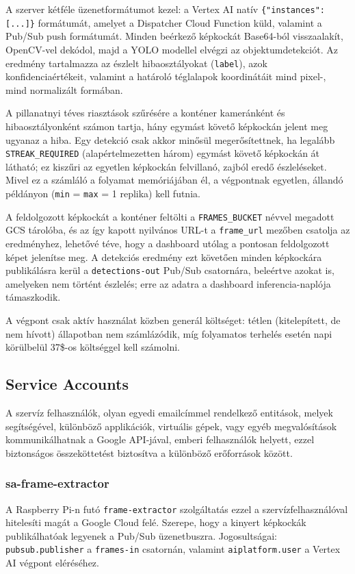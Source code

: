         A szerver kétféle üzenetformátumot kezel: a Vertex AI natív \texttt{\{"instances": [...]\}} formátumát,
        amelyet a Dispatcher Cloud Function küld, valamint a Pub/Sub push formátumát.
        Minden beérkező képkockát Base64-ból visszaalakít, OpenCV-vel dekódol, majd a YOLO modellel elvégzi az objektumdetekciót.
        Az eredmény tartalmazza az észlelt hibaosztályokat (\texttt{label}), azok konfidenciaértékeit, valamint a határoló téglalapok
        koordinátáit mind pixel-, mind normalizált formában.

        A pillanatnyi téves riasztások szűrésére a konténer kameránként és hibaosztályonként számon tartja, hány egymást követő képkockán
        jelent meg ugyanaz a hiba. Egy detekció csak akkor minősül megerősítettnek, ha legalább \texttt{STREAK\_REQUIRED}
        (alapértelmezetten három) egymást követő képkockán át látható; ez kiszűri az egyetlen képkockán felvillanó, zajból eredő észleléseket.
        Mivel ez a számláló a folyamat memóriájában él, a végpontnak egyetlen, állandó példányon (\texttt{min} = \texttt{max} = 1 replika) kell futnia.

        A feldolgozott képkockát a konténer feltölti a \texttt{FRAMES\_BUCKET} névvel megadott GCS tárolóba, és az így kapott nyilvános URL-t a
        \texttt{frame\_url} mezőben csatolja az eredményhez, lehetővé téve, hogy a dashboard utólag a pontosan feldolgozott képet jelenítse meg.
        A detekciós eredmény ezt követően minden képkockára publikálásra kerül a \texttt{detections-out} Pub/Sub csatornára, beleértve azokat is,
        amelyeken nem történt észlelés; erre az adatra a dashboard inferencia-naplója támaszkodik.

        A végpont csak aktív használat közben generál költséget: tétlen (kitelepített, de nem hívott) állapotban nem számlázódik,
        míg folyamatos terhelés esetén napi körülbelül 37\$-os költséggel kell számolni.

        \subsection{Service Accounts}
        A szervíz felhasználók, olyan egyedi emailcímmel rendelkező entitások, melyek segítségével, különböző applikációk, virtuális gépek, vagy egyéb megvalósítások
        kommunikálhatnak a Google API-jával, emberi felhasználók helyett, ezzel biztonságos összeköttetést biztosítva a különböző erőforrások között.

            \subsubsection{sa-frame-extractor}
            \begin{sloppypar}
            A Raspberry Pi-n futó \texttt{frame-extractor} szolgáltatás ezzel a szervízfelhasználóval hitelesíti magát a Google Cloud felé.
            Szerepe, hogy a kinyert képkockák publikálhatóak legyenek a Pub/Sub üzenetbuszra. Jogosultságai: \texttt{pubsub.publisher}
            a \texttt{frames-in} csatornán, valamint \texttt{aiplatform.user} a Vertex AI végpont eléréséhez.
            \end{sloppypar}

